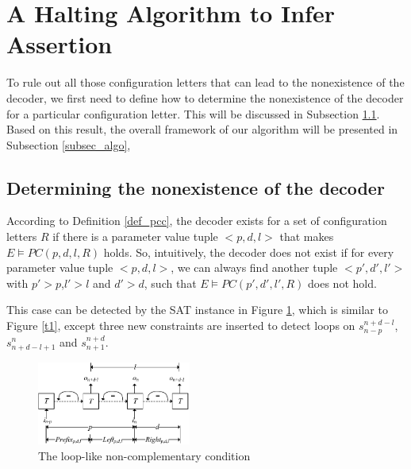 \documentclass[journal]{IEEEtran}
\begin{document}
\section{A Halting Algorithm to Infer Assertion}\label{sec_algo}
To rule out all those configuration letters that can lead to the nonexistence of the decoder,
we first need to define how to determine the nonexistence of the decoder for a particular configuration letter.
This will be discussed in Subsection \ref{subsec_chknonext}.
Based on this result,
the overall framework of our algorithm will be presented in Subsection \ref{subsec_algo},

\subsection{Determining the nonexistence of the decoder}\label{subsec_chknonext}


According to Definition \ref{def_pcc},
the decoder exists for a set of configuration letters $R$ if there is a parameter value tuple $<p,d,l>$ that makes
$E\vDash PC(p,d,l,R)$ holds.
So,
intuitively,
the decoder does not exist if for every parameter value tuple $<p,d,l>$,
we can always find another tuple $<p',d',l'>$ with $p'>p$,$l'>l$ and $d'>d$,
such that $E\vDash PC(p',d',l',R)$ does not hold.

This case can be detected by the SAT instance in Figure \ref{fig_double_loop},
which is similar to Figure \ref{t1},
except three new constraints are inserted to detect loops on $s_{n-p}^{n+d-l}$,$s_{n+d-l+1}^n$ and $s_{n+1}^{n+d}$.

\begin{figure}[t]
\begin{center}
\includegraphics[width=0.45\textwidth]{doubleloop}
\end{center}
\caption{The loop-like non-complementary condition}
  \label{fig_double_loop}
\end{figure}
\end{document}
